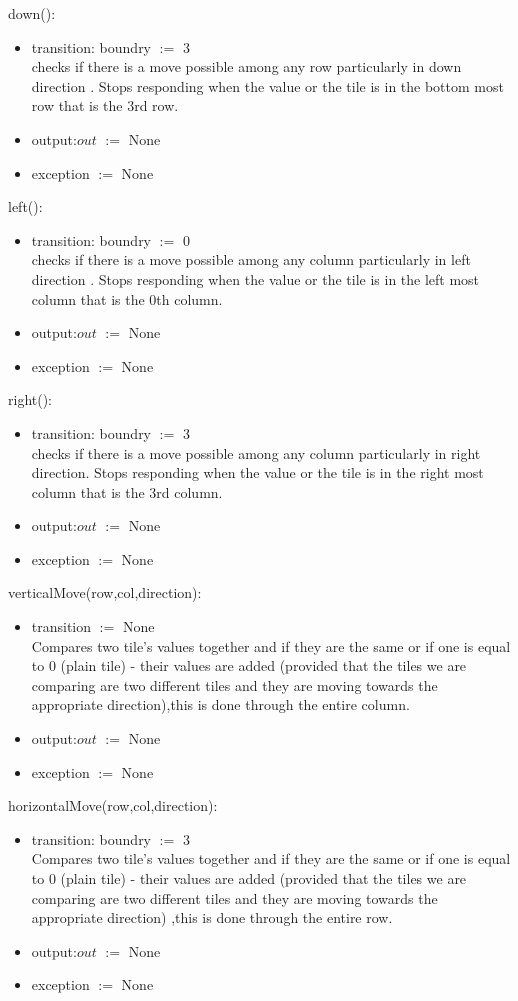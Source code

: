 \documentclass[12pt]{article}
\begin{document}
\noindent down():
\begin{itemize}
\item transition: boundry $:=$ 3\\
 checks if there is a move possible among any row particularly in down direction . Stops responding when the
 value or the tile is in the bottom most row that is the 3rd row.
  \item output:$out$ $:=$ None
      \item exception $:=$ None
\end{itemize}

\noindent left():
\begin{itemize}
\item transition: boundry $:=$ 0\\
 checks if there is a move possible among any column particularly in left direction . Stops responding when the value or the tile is in the left most column that is the 0th column.
  \item output:$out$ $:=$ None
      \item exception $:=$ None
\end{itemize}

\noindent right():
\begin{itemize}
\item transition: boundry $:=$ 3\\
 checks if there is a move possible among any column particularly in right direction. Stops responding when the value or the tile is in the right most column that is the 3rd column.
  \item output:$out$ $:=$ None
      \item exception $:=$ None
\end{itemize}

\noindent verticalMove(row,col,direction):
\begin{itemize}
\item transition $:=$ None\\
Compares two tile's values together and if they are the same or if one is equal to 0 (plain tile) - their values are added (provided that the tiles we are comparing are two different tiles and they are moving towards the appropriate direction),this is done through the entire column.
  \item output:$out$ $:=$ None
      \item exception $:=$ None
\end{itemize}

\noindent horizontalMove(row,col,direction):
\begin{itemize}
\item transition: boundry $:=$ 3\\
Compares two tile's values together and if they are the same or if one is equal to 0 (plain tile) - their values are added (provided that the tiles we are comparing are two different tiles and they are moving towards the appropriate direction) ,this is done through the entire row.
  \item output:$out$ $:=$ None
      \item exception $:=$ None
\end{itemize}
\end{document}
